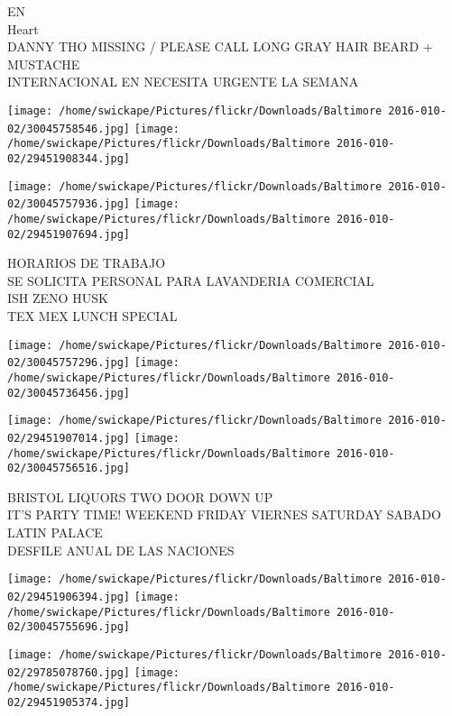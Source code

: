 \documentclass[10pt,letterpaper]{article}
\begin{document}
EN\\
Heart\\
DANNY THO MISSING / PLEASE CALL LONG GRAY HAIR BEARD + MUSTACHE\\
INTERNACIONAL EN NECESITA URGENTE LA SEMANA\\
\pagebreak

\texttt{[image: /home/swickape/Pictures/flickr/Downloads/Baltimore 2016-010-02/30045758546.jpg]}
\texttt{[image: /home/swickape/Pictures/flickr/Downloads/Baltimore 2016-010-02/29451908344.jpg]}

\texttt{[image: /home/swickape/Pictures/flickr/Downloads/Baltimore 2016-010-02/30045757936.jpg]}
\texttt{[image: /home/swickape/Pictures/flickr/Downloads/Baltimore 2016-010-02/29451907694.jpg]}

HORARIOS DE TRABAJO\\
SE SOLICITA PERSONAL PARA LAVANDERIA COMERCIAL\\
ISH ZENO HUSK\\
TEX MEX LUNCH SPECIAL\\
\pagebreak

\texttt{[image: /home/swickape/Pictures/flickr/Downloads/Baltimore 2016-010-02/30045757296.jpg]}
\texttt{[image: /home/swickape/Pictures/flickr/Downloads/Baltimore 2016-010-02/30045736456.jpg]}

\texttt{[image: /home/swickape/Pictures/flickr/Downloads/Baltimore 2016-010-02/29451907014.jpg]}
\texttt{[image: /home/swickape/Pictures/flickr/Downloads/Baltimore 2016-010-02/30045756516.jpg]}

BRISTOL LIQUORS TWO DOOR DOWN UP\\
IT'S PARTY TIME!  WEEKEND FRIDAY VIERNES SATURDAY SABADO\\
LATIN PALACE\\
DESFILE ANUAL DE LAS NACIONES\\
\pagebreak

\texttt{[image: /home/swickape/Pictures/flickr/Downloads/Baltimore 2016-010-02/29451906394.jpg]}
\texttt{[image: /home/swickape/Pictures/flickr/Downloads/Baltimore 2016-010-02/30045755696.jpg]}

\texttt{[image: /home/swickape/Pictures/flickr/Downloads/Baltimore 2016-010-02/29785078760.jpg]}
\texttt{[image: /home/swickape/Pictures/flickr/Downloads/Baltimore 2016-010-02/29451905374.jpg]}
\end{document}
